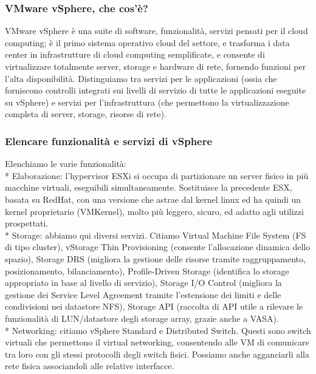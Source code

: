 \documentclass[11pt]{article}
\begin{document}
\subsubsection{VMware vSphere, che cos'è?}
VMware vSphere è una suite di software, funzionalità, servizi pensati per il cloud computing; è il primo sistema operativo cloud del settore, e trasforma i data center in infrastrutture di cloud computing semplificate, e consente di virtualizzare totalmente server, storage e hardware di rete, fornendo funzioni per l'alta disponibilità. Distinguiamo tra servizi per le applicazioni (ossia che forniscono controlli integrati sui livelli di servizio di tutte le applicazioni eseguite su vSphere) e servizi per l'infrastruttura (che permettono la virtualizzazione completa di server, storage, risorse di rete). 

\subsubsection{Elencare funzionalità e servizi di vSphere}
Elenchiamo le varie funzionalità:
\\* Elaborazione: l'hypervisor ESXi si occupa di partizionare un server fisico in più macchine virtuali, eseguibili simultaneamente. Sostituisce la precedente ESX, basata su RedHat, con una versione che astrae dal kernel linux ed ha quindi un kernel proprietario (VMKernel), molto più leggero, sicuro, ed adatto agli utilizzi prospettati.
\\* Storage: abbiamo qui diversi servizi. Citiamo Virtual Machine File System (FS di tipo cluster), vStorage Thin Provisioning (consente l'allocazione dinamica dello spazio), Storage DRS (migliora la gestione delle risorse tramite raggruppamento, posizionamento, bilanciamento), Profile-Driven Storage (identifica lo storage appropriato in base al livello di servizio), Storage I/O Control (migliora la gestione dei Service Level Agreement tramite l'estensione dei limiti e delle condivisioni nei datastore NFS), Storage API (raccolta di API utile a rilevare le funzionalità di LUN/datastore degli storage array, grazie anche a VASA).
\\* Networking: citiamo vSphere Standard e Distributed Switch. Questi sono switch virtuali che permettono il virtual networking, consentendo alle VM di comunicare tra loro con gli stessi protocolli degli switch fisici. Possiamo anche agganciarli alla rete fisica associandoli alle relative interfacce.
\end{document}
